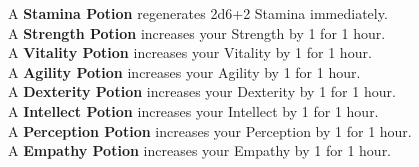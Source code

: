 A \textbf{Stamina Potion} regenerates 2d6+2 Stamina immediately.\\

A \textbf{Strength Potion} increases your Strength by 1 for 1 hour.\\

A \textbf{Vitality Potion} increases your Vitality by 1 for 1 hour.\\

A \textbf{Agility Potion} increases your Agility by 1 for 1 hour.\\

A \textbf{Dexterity Potion} increases your Dexterity by 1 for 1 hour.\\

A \textbf{Intellect Potion} increases your Intellect by 1 for 1 hour.\\

A \textbf{Perception Potion} increases your Perception by 1 for 1 hour.\\

A \textbf{Empathy Potion} increases your Empathy by 1 for 1 hour.